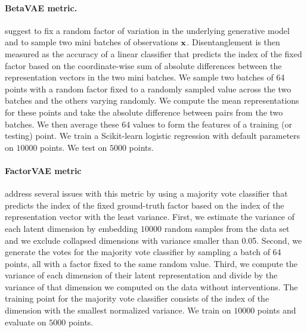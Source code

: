 \paragraph{BetaVAE metric.} \citet{higgins2016beta} suggest to fix a random factor of variation in the underlying generative model and to sample two mini batches of observations ${\mathbf{x}}$. 
Disentanglement is then measured as the accuracy of a linear classifier that predicts the index of the fixed factor based on the coordinate-wise sum of absolute differences between the representation vectors in the two mini batches.
We sample two batches of 64 points with a random factor fixed to a randomly sampled value across the two batches and the others varying randomly. 
We compute the mean representations for these points and take the absolute difference between pairs from the two batches. 
We then average these 64 values to form the features of a training (or testing) point. 
We train a Scikit-learn logistic regression with default parameters on $\num{10000}$ points. 
We test on $\num{5000}$ points.

\paragraph{FactorVAE metric}
\citet{kim2018disentangling} address several issues with this metric by using a majority vote classifier that predicts the index of the fixed ground-truth factor based on the index of the representation vector with the least variance.
First, we estimate the variance of each latent dimension by embedding $\num{10000}$ random samples from the data set and we exclude collapsed dimensions with variance smaller than 0.05. 
Second, we generate the votes for the majority vote classifier by sampling a batch of 64 points, all with a factor fixed to the same random value. 
Third, we compute the variance of each dimension of their latent representation and divide by the variance of that dimension we computed on the data without interventions. 
The training point for the majority vote classifier consists of the index of the dimension with the smallest normalized variance. 
We train on $\num{10000}$ points and evaluate on $\num{5000}$ points.

